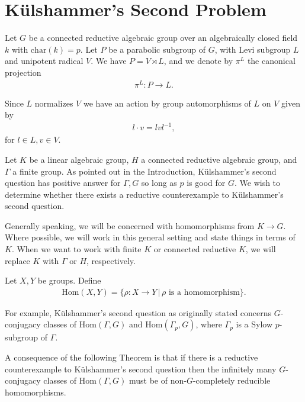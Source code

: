 
\chapter{K\"ulshammer's Second Problem}
\label{Chapter4}

Let $G$ be a connected reductive algebraic group over an algebraically closed field $k$ with $\mathrm{char}(k) = p$. Let $P$ be a parabolic subgroup of $G$, with Levi subgroup $L$ and unipotent radical $V$. We have $P = V \rtimes L$, and we denote by $\pi^L$ the canonical projection
\begin{eqnarray*} \pi^L:P \rightarrow L. \end{eqnarray*}

Since $L$ normalizes $V$ we have an action by group automorphisms of $L$ on $V$ given by
\begin{eqnarray} \label{laction} l \cdot v = lvl^{-1}, \end{eqnarray}
for $l \in L, v \in V$.

Let $K$ be a linear algebraic group, $H$ a connected reductive algebraic group, and $\Gamma$ a finite group.
As pointed out in the Introduction, K\"ulshammer's second question has positive answer for $\Gamma, G$ so long as $p$ is good for $G$. We wish to determine whether there exists a reductive counterexample to K\"ulshammer's second question.


Generally speaking, we will be concerned with homomorphisms from $K \rightarrow G$. Where possible, we will work in this general setting and state things in terms of $K$. When we want to work with finite $K$ or connected reductive $K$, we will replace $K$ with $\Gamma$ or $H$, respectively.

\begin{definition} Let $X,Y$ be groups. Define
\begin{eqnarray*} \mathrm{Hom}(X, Y) = \{ \rho : X \rightarrow Y \,|\, \rho \textrm{ is a homomorphism}\}. 
\end{eqnarray*}
\end{definition}

For example, K\"ulshammer's second question as originally stated concerns $G$-conjugacy classes of $\mathrm{Hom}(\Gamma, G)$ and $\mathrm{Hom}(\Gamma_p, G)$, where $\Gamma_p$ is a Sylow $p$-subgroup of $\Gamma$.


A consequence of the following Theorem \cite[Theorem 1.2]{martin2003reductive} is that if there is a reductive counterexample to K\"ulshammer's second question then the infinitely many $G$-conjugacy classes of $\mathrm{Hom}(\Gamma, G)$ must be of non-$G$-completely reducible homomorphisms.

